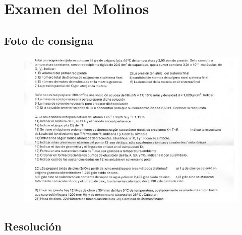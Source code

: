 \section*{Examen del Molinos}

\subsection*{Foto de consigna}
\begin{figure}[H]
    \centering
    \includegraphics[width=0.7\linewidth]{Images/molinos_examen_6.jpg}
\end{figure}


\subsection*{Resolución}

